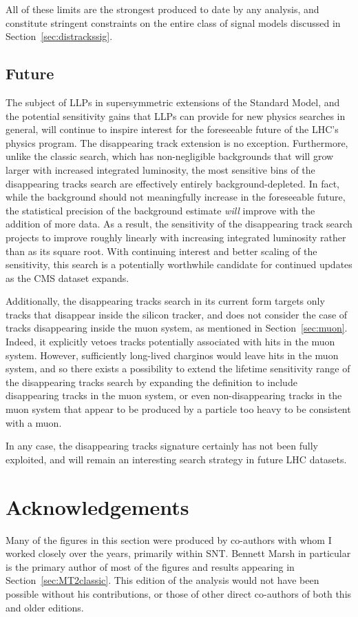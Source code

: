   All of these limits are the strongest produced to date by any analysis, and constitute stringent constraints on the entire class of signal models discussed in Section~\ref{sec:distrackssig}.

  \subsection{Future} \label{sec:distracksfuture}
  
  The subject of LLPs in supersymmetric extensions of the Standard Model, and the potential sensitivity gains that LLPs can provide for new physics searches in general, will continue to inspire interest for the foreseeable future of the LHC's physics program.
  The \mttwo disappearing track extension is no exception.
  Furthermore, unlike the classic search, which has non-negligible backgrounds that will grow larger with increased integrated luminosity, the most sensitive bins of the disappearing tracks search are effectively entirely background-depleted.
  In fact, while the background should not meaningfully increase in the foreseeable future, the statistical precision of the background estimate {\it will} improve with the addition of more data.
  As a result, the sensitivity of the disappearing track search projects to improve roughly linearly with increasing integrated luminosity rather than as its square root.
  With continuing interest and better scaling of the sensitivity, this search is a potentially worthwhile candidate for continued updates as the CMS dataset expands.

  Additionally, the disappearing tracks search in its current form targets only tracks that disappear inside the silicon tracker, and does not consider the case of tracks disappearing inside the muon system, as mentioned in Section~\ref{sec:muon}.
  Indeed, it explicitly vetoes tracks potentially associated with hits in the muon system.
  However, sufficiently long-lived charginos would leave hits in the muon system, and so there exists a possibility to extend the lifetime sensitivity range of the disappearing tracks search by expanding the definition to include disappearing tracks in the muon system, or even non-disappearing tracks in the muon system that appear to be produced by a particle too heavy to be consistent with a muon.

  In any case, the disappearing tracks signature certainly has not been fully exploited, and will remain an interesting search strategy in future LHC datasets.


\section{Acknowledgements}

Many of the figures in this section were produced by co-authors with whom I worked closely over the years, primarily within SNT.
Bennett Marsh in particular is the primary author of most of the figures and results appearing in Section~\ref{sec:MT2classic}.
This edition of the analysis would not have been possible without his contributions, or those of other direct co-authors of both this and older editions.
